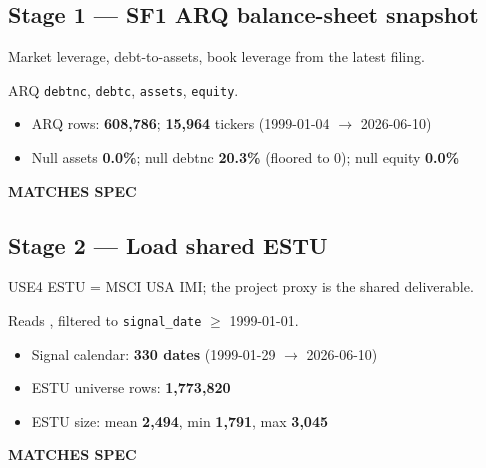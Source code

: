 \documentclass[11pt,a4paper]{article}
\newcommand{\PASS}[1]{\textcolor{pass}{\textbf{#1}}}
\begin{document}
\subsection{Stage 1 --- SF1 ARQ balance-sheet snapshot}

\begin{description}[style=nextline]
  \item[PDF SPEC] Market leverage, debt-to-assets, book leverage from the latest filing.
  \item[Implementation] ARQ \texttt{debtnc}, \texttt{debtc}, \texttt{assets}, \texttt{equity}.
  \item[Observed]\phantom{x}
    \begin{itemize}[nosep, topsep=-\parskip]
      \item ARQ rows: \textbf{608{,}786}; \textbf{15{,}964} tickers (1999-01-04 $\to$ 2026-06-10)
      \item Null assets \textbf{0.0\%}; null debtnc \textbf{20.3\%} (floored to 0); null equity \textbf{0.0\%}
    \end{itemize}
  \item[Status] \PASS{MATCHES SPEC}
\end{description}

\subsection{Stage 2 --- Load shared ESTU}

\begin{description}[style=nextline]
  \item[PDF SPEC] USE4 ESTU = MSCI USA IMI; the project proxy is the shared  deliverable.
  \item[Implementation] Reads , filtered to \texttt{signal\_date} $\geq$ 1999-01-01.
  \item[Observed]\phantom{x}
    \begin{itemize}[nosep, topsep=-\parskip]
      \item Signal calendar: \textbf{330 dates} (1999-01-29 $\to$ 2026-06-10)
      \item ESTU universe rows: \textbf{1{,}773{,}820}
      \item ESTU size: mean \textbf{2{,}494}, min \textbf{1{,}791}, max \textbf{3{,}045}
    \end{itemize}
  \item[Status] \PASS{MATCHES SPEC}
\end{description}
\end{document}
